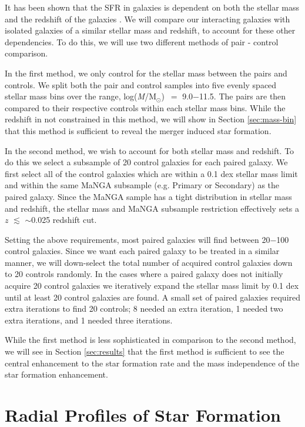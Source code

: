 \documentclass[iop,revtex4,twocolumn,apj,numberedappendix,appendixfloats]{emulateapj}
\newcommand{\logm}{log({\it M}/M$_{\odot}$)}
\begin{document}
It has been shown that the SFR in galaxies is dependent on both the stellar mass and the redshift of the galaxies \citep{Noeske:2007}. We will compare our interacting galaxies with isolated galaxies of a similar stellar mass and redshift, to account for these other dependencies. To do this, we will use two different methods of pair - control comparison. 

In the first method, we only control for the stellar mass between the pairs and controls. We split both the pair and control samples into five evenly spaced stellar mass bins over the range, \logm\ $=$ 9.0$-$11.5. The pairs are then compared to their respective controls within each stellar mass bins. While the redshift in not constrained in this method, we will show in Section \ref{sec:mass-bin} that this method is sufficient to reveal the merger induced star formation. 


In the second method, we wish to account for both stellar mass and redshift. To do this we select a subsample of 20 control galaxies for each paired galaxy. We first select all of the control galaxies which are within a 0.1 dex stellar mass limit and within the same MaNGA subsample (e.g. Primary or Secondary) as the paired galaxy. Since the MaNGA sample has a tight distribution in stellar mass and redshift, the stellar mass and MaNGA subsample restriction effectively sets a $z$ $\lesssim$ $\sim$0.025 redshift cut. 

Setting the above requirements, most paired galaxies will find between 20$-$100 control galaxies. Since we want each paired galaxy to be treated in a similar manner, we will down-select the total number of acquired control galaxies down to 20 controls randomly. In the cases where a paired galaxy does not initially acquire 20 control galaxies we iteratively expand the stellar mass limit by 0.1 dex until at least 20 control galaxies are found. A small set of paired galaxies required extra iterations to find 20 controls; 8 needed an extra iteration, 1 needed two extra iterations, and 1 needed three iterations.

While the first method is less sophisticated in comparison to the second method, we will see in Section \ref{sec:results} that the first method is sufficient to see the central enhancement to the star formation rate and the mass independence of the star formation enhancement.

\section{Radial Profiles of Star Formation}\label{sec:analysis}
\end{document}
